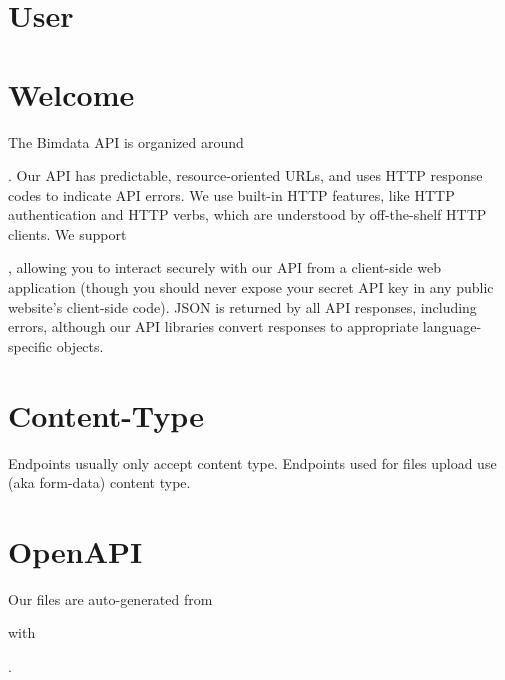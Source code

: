 \documentclass[a4paper,12pt,english]{sphinxmanual}
\begin{document}
\section{User}
\label{\detokenize{api_playground/user_endpoint:user}}\label{\detokenize{api_playground/user_endpoint::doc}}

\section{Welcome}
\label{\detokenize{api_playground/index:welcome}}
The Bimdata API is organized around %
\begin{footnote}[18]\sphinxAtStartFootnote
{}
%
\end{footnote}. Our API has predictable, resource-oriented URLs, and uses HTTP response codes to indicate API errors.
We use built-in HTTP features, like HTTP authentication and HTTP verbs, which are understood by off-the-shelf HTTP clients.
We support %
\begin{footnote}[19]\sphinxAtStartFootnote
{}
%
\end{footnote}, allowing you to interact securely with our API from a client-side web application (though you should never expose your secret API key in any public website’s client-side code).
JSON is returned by all API responses, including errors, although our API libraries convert responses to appropriate language-specific objects.


\section{Content-Type}
\label{\detokenize{api_playground/index:content-type}}
Endpoints usually only accept  content type.
Endpoints used for files upload use  (aka form-data) content type.


\section{OpenAPI}
\label{\detokenize{api_playground/index:openapi}}
Our files are auto-generated from %
\begin{footnote}[20]\sphinxAtStartFootnote
{}
%
\end{footnote} with %
\begin{footnote}[21]\sphinxAtStartFootnote
{}
%
\end{footnote}.
\end{document}
